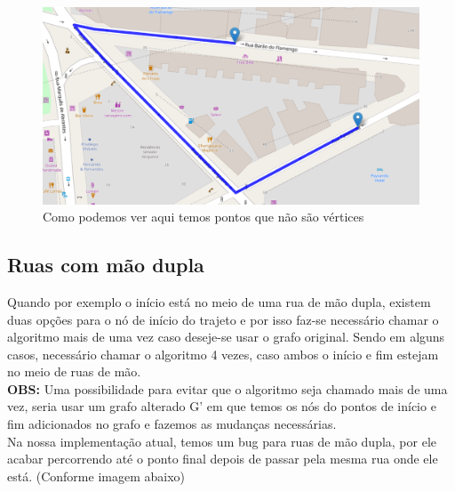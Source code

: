 \documentclass{article}
\begin{document}
\begin{figure}[H]
    \centering
    \includegraphics[scale=0.43]{EDAreport-fraction-edge.png}
    \caption{Como podemos ver aqui temos pontos que não são vértices}
    \label{fig:my_label}
\end{figure}

\subsection{Ruas com mão dupla}
Quando por exemplo o início está no meio de uma rua de mão dupla, existem duas opções para o nó de início do trajeto e por isso faz-se necessário chamar o algoritmo mais de uma vez caso deseje-se usar o grafo original. Sendo em alguns casos, necessário chamar o algoritmo 4 vezes, caso ambos o início e fim estejam no meio de ruas de mão.\\
\textbf{OBS:} Uma possibilidade para evitar que o algoritmo seja chamado mais de uma vez, seria usar um grafo alterado G' em que temos os nós do pontos de início e fim adicionados no grafo e fazemos as mudanças necessárias.\\

Na nossa implementação atual, temos um bug para ruas de mão dupla, por ele acabar percorrendo até o ponto final depois de passar pela mesma rua onde ele está. (Conforme imagem abaixo)
\end{document}
